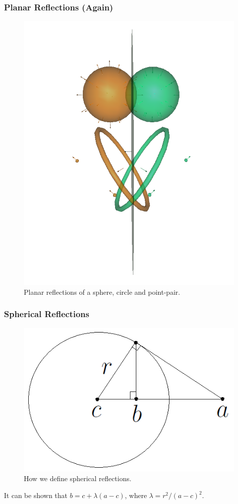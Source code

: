 \documentclass{beamer}
\begin{document}
\begin{frame}
\frametitle{Planar Reflections (Again)}
\begin{figure}
\centering
\includegraphics[scale=0.3]{PlanarReflectionsPerspectiveTwo}
\caption{Planar reflections of a sphere, circle and point-pair.}
\end{figure}
\end{frame}

\begin{frame}
\frametitle{Spherical Reflections}
\begin{figure}
\centering
\includegraphics[scale=0.3]{SphericalReflectionFigure}
\caption{How we define spherical reflections.}
\end{figure}\pause
It can be shown that $b = c+\lambda(a-c)$, where $\lambda=r^2/(a-c)^2$.
\end{frame}
\end{document}
